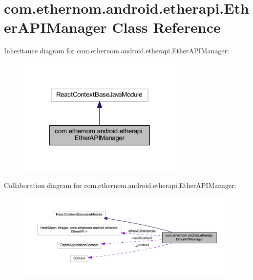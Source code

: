 \hypertarget{classcom_1_1ethernom_1_1android_1_1etherapi_1_1_ether_a_p_i_manager}{}\section{com.\+ethernom.\+android.\+etherapi.\+Ether\+A\+P\+I\+Manager Class Reference}
\label{classcom_1_1ethernom_1_1android_1_1etherapi_1_1_ether_a_p_i_manager}


Inheritance diagram for com.\+ethernom.\+android.\+etherapi.\+Ether\+A\+P\+I\+Manager\+:\nopagebreak
\begin{figure}[H]
\begin{center}
\leavevmode
\includegraphics[width=234pt]{classcom_1_1ethernom_1_1android_1_1etherapi_1_1_ether_a_p_i_manager__inherit__graph}
\end{center}
\end{figure}


Collaboration diagram for com.\+ethernom.\+android.\+etherapi.\+Ether\+A\+P\+I\+Manager\+:\nopagebreak
\begin{figure}[H]
\begin{center}
\leavevmode
\includegraphics[width=350pt]{classcom_1_1ethernom_1_1android_1_1etherapi_1_1_ether_a_p_i_manager__coll__graph}
\end{center}
\end{figure}
